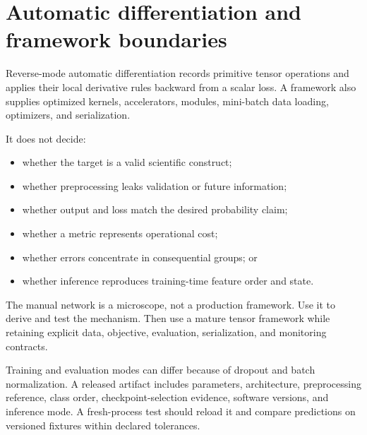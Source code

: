 \section{Automatic differentiation and framework boundaries}

Reverse-mode automatic differentiation records primitive tensor operations and
applies their local derivative rules backward from a scalar loss. A framework
also supplies optimized kernels, accelerators, modules, mini-batch data
loading, optimizers, and serialization.

It does not decide:
\begin{itemize}
  \item whether the target is a valid scientific construct;
  \item whether preprocessing leaks validation or future information;
  \item whether output and loss match the desired probability claim;
  \item whether a metric represents operational cost;
  \item whether errors concentrate in consequential groups; or
  \item whether inference reproduces training-time feature order and state.
\end{itemize}

\begin{professionalbox}
The manual network is a microscope, not a production framework. Use it to
derive and test the mechanism. Then use a mature tensor framework while
retaining explicit data, objective, evaluation, serialization, and monitoring
contracts.
\end{professionalbox}

Training and evaluation modes can differ because of dropout and batch
normalization. A released artifact includes parameters, architecture,
preprocessing reference, class order, checkpoint-selection evidence, software
versions, and inference mode. A fresh-process test should reload it and compare
predictions on versioned fixtures within declared tolerances.

